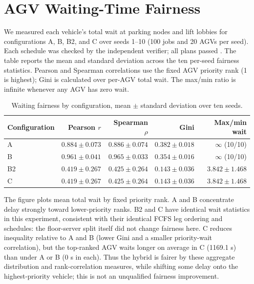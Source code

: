 \section{AGV Waiting-Time Fairness}
\label{sec:priority-wait-fairness}

We measured each vehicle's total wait at parking nodes and lift lobbies for
configurations A, B, B2, and C over seeds 1--10 (100 jobs and 20 AGVs per
seed). Each schedule was checked by the independent verifier; all plans
passed \cite{projectRepo}. The table reports the mean and standard deviation across the
ten per-seed fairness statistics. Pearson and Spearman correlations use the
fixed AGV priority rank (1 is highest); Gini is calculated over per-AGV total
wait. The max/min ratio is infinite whenever any AGV has zero wait.

\begin{table}[htbp]
\centering
\caption{Waiting fairness by configuration, mean $\pm$ standard deviation over ten seeds.}
\label{tab:fairness-configs}
\begin{tabular}{lrrrr}
\toprule
Configuration & Pearson $r$ & Spearman $\rho$ & Gini & Max/min wait \\
\midrule
A   & $0.884\pm0.073$ & $0.886\pm0.074$ & $0.382\pm0.018$ & $\infty$ (10/10) \\
B   & $0.961\pm0.041$ & $0.965\pm0.033$ & $0.354\pm0.016$ & $\infty$ (10/10) \\
B2  & $0.419\pm0.267$ & $0.425\pm0.264$ & $0.143\pm0.036$ & $3.842\pm1.468$ \\
C   & $0.419\pm0.267$ & $0.425\pm0.264$ & $0.143\pm0.036$ & $3.842\pm1.468$ \\
\bottomrule
\end{tabular}
\end{table}

The figure plots mean total wait by fixed priority rank. A and B concentrate
delay strongly toward lower-priority ranks. B2 and C have identical wait
statistics in this experiment, consistent with their identical FCFS leg
ordering and schedules: the floor-server split itself did not change fairness
here. C reduces inequality relative to A and B (lower Gini and a smaller
priority-wait correlation), but the top-ranked AGV waits longer on average in
C (1169.1 s) than under A or B (0 s in each). Thus the hybrid is fairer by
these aggregate distribution and rank-correlation measures, while shifting
some delay onto the highest-priority vehicle; this is not an unqualified
fairness improvement.

